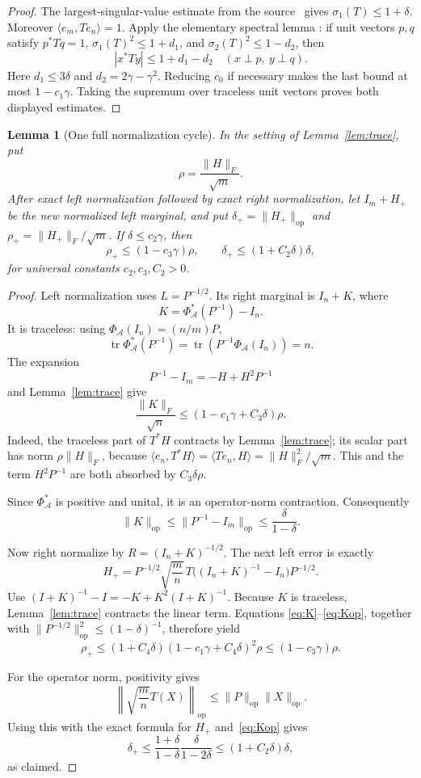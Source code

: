 \documentclass[11pt]{article}
\newtheorem{lemma}[theorem]{Lemma}
\newcommand{\Acal}{\mathcal A}
\newcommand{\PhiA}{\Phi_{\Acal}}
\newcommand{\tr}{\operatorname{tr}}
\newcommand{\op}{\mathrm{op}}
\begin{document}
\begin{proof}
The largest-singular-value estimate from the source~\cite[Lemma 3.6]{KLR}
gives $\sigma_1(T)\le1+\delta$.  Moreover
$\langle e_m,Te_n\rangle=1$.  Apply the elementary spectral lemma
\cite[Lemma 3.7]{KLR}: if unit vectors $p,q$ satisfy
$p^*Tq=1$, $\sigma_1(T)^2\le1+d_1$, and
$\sigma_2(T)^2\le1-d_2$, then
\[
 |x^*Ty|\le1+d_1-d_2
 \quad(x\perp p,\ y\perp q).
\]
Here $d_1\le3\delta$ and $d_2=2\gamma-\gamma^2$.  Reducing $c_0$ if
necessary makes the last bound at most $1-c_1\gamma$.  Taking the supremum
over traceless unit vectors proves both displayed estimates.
\end{proof}

\begin{lemma}[One full normalization cycle]\label{lem:cycle}
In the setting of Lemma~\ref{lem:trace}, put
\[
 \rho=\frac{\|H\|_F}{\sqrt m}.
\]
After exact left normalization followed by exact right normalization, let
$I_m+H_+$ be the new normalized left marginal, and put
$\delta_+=\|H_+\|_{\op}$ and
$\rho_+=\|H_+\|_F/\sqrt m$.  If $\delta\le c_2\gamma$, then
\[
 \rho_+\le(1-c_3\gamma)\rho,
 \qquad
 \delta_+\le(1+C_2\delta)\delta,
\]
for universal constants $c_2,c_3,C_2>0$.
\end{lemma}

\begin{proof}
Left normalization uses $L=P^{-1/2}$.  Its right marginal is $I_n+K$, where
\[
 K=\PhiA^*(P^{-1})-I_n.
\]
It is traceless: using $\PhiA(I_n)=(n/m)P$,
\[
 \tr\PhiA^*(P^{-1})
 =\tr(P^{-1}\PhiA(I_n))=n.
\]
The expansion
\[
 P^{-1}-I_m=-H+H^2P^{-1}
\]
and Lemma~\ref{lem:trace} give
\begin{equation}\label{eq:K}
 \frac{\|K\|_F}{\sqrt n}
 \le (1-c_1\gamma+C_3\delta)\rho.
\end{equation}
Indeed, the traceless part of $T^*H$ contracts by Lemma~\ref{lem:trace}; its
scalar part has norm $\rho\|H\|_F$, because
$\langle e_n,T^*H\rangle=\langle Te_n,H\rangle=\|H\|_F^2/\sqrt m$.
This and the term $H^2P^{-1}$ are both absorbed by $C_3\delta\rho$.

Since $\PhiA^*$ is positive and unital, it is an operator-norm contraction.
Consequently
\begin{equation}\label{eq:Kop}
 \|K\|_{\op}\le\|P^{-1}-I_m\|_{\op}
 \le\frac{\delta}{1-\delta}.
\end{equation}

Now right normalize by $R=(I_n+K)^{-1/2}$.  The next left error is exactly
\[
 H_+=P^{-1/2}\sqrt{\frac mn}\,
 T\big((I_n+K)^{-1}-I_n\big)P^{-1/2}.
\]
Use $(I+K)^{-1}-I=-K+K^2(I+K)^{-1}$.  Because $K$ is traceless,
Lemma~\ref{lem:trace} contracts the linear term.  Equations
\eqref{eq:K}--\eqref{eq:Kop}, together with
$\|P^{-1/2}\|_{\op}^2\le(1-\delta)^{-1}$, therefore yield
\[
 \rho_+\le
 (1+C_4\delta)(1-c_1\gamma+C_4\delta)^2\rho
 \le(1-c_3\gamma)\rho.
\]

For the operator norm, positivity gives
\[
 \left\|\sqrt{\frac mn}T(X)\right\|_{\op}
 \le\|P\|_{\op}\|X\|_{\op}.
\]
Using this with the exact formula for $H_+$ and~\eqref{eq:Kop} gives
\[
 \delta_+
 \le \frac{1+\delta}{1-\delta}
       \frac{\delta}{1-2\delta}
 \le(1+C_2\delta)\delta,
\]
as claimed.
\end{proof}
\end{document}
